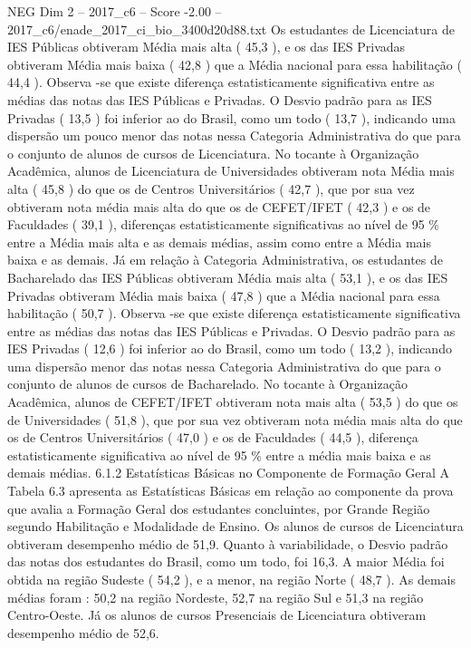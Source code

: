 \begin{textsample}{NEG Dim 2 – 2017\_c6 – Score -2.00 – 2017\_c6/enade\_2017\_ci\_bio\_3400d20d88.txt}
Os estudantes de Licenciatura de IES Públicas obtiveram Média mais alta ( 45,3 ), e os das IES Privadas obtiveram Média mais baixa ( 42,8 ) que a Média nacional para essa habilitação ( 44,4 ).
Observa -se que existe diferença estatisticamente significativa entre as médias das notas das IES Públicas e Privadas.
O Desvio padrão para as IES Privadas ( 13,5 ) foi inferior ao do Brasil, como um todo ( 13,7 ), indicando uma dispersão um pouco menor das notas nessa Categoria Administrativa do que para o conjunto de alunos de cursos de Licenciatura.
No tocante à Organização Acadêmica, alunos de Licenciatura de Universidades obtiveram nota Média mais alta ( 45,8 ) do que os de Centros Universitários ( 42,7 ), que por sua vez obtiveram nota média mais alta do que os de CEFET/IFET ( 42,3 ) e os de Faculdades ( 39,1 ), diferenças estatisticamente significativas ao nível de 95 \% entre a Média mais alta e as demais médias, assim como entre a Média mais baixa e as demais.
Já em relação à Categoria Administrativa, os estudantes de Bacharelado das IES Públicas obtiveram Média mais alta ( 53,1 ), e os das IES Privadas obtiveram Média mais baixa ( 47,8 ) que a Média nacional para essa habilitação ( 50,7 ).
Observa -se que existe diferença estatisticamente significativa entre as médias das notas das IES Públicas e Privadas.
O Desvio padrão para as IES Privadas ( 12,6 ) foi inferior ao do Brasil, como um todo ( 13,2 ), indicando uma dispersão menor das notas nessa Categoria Administrativa do que para o conjunto de alunos de cursos de Bacharelado.
No tocante à Organização Acadêmica, alunos de CEFET/IFET obtiveram nota mais alta ( 53,5 ) do que os de Universidades ( 51,8 ), que por sua vez obtiveram nota média mais alta do que os de Centros Universitários ( 47,0 ) e os de Faculdades ( 44,5 ), diferença estatisticamente significativa ao nível de 95 \% entre a média mais baixa e as demais médias. 6.1.2 Estatísticas Básicas no Componente de Formação Geral A Tabela 6.3 apresenta as Estatísticas Básicas em relação ao componente da prova que avalia a Formação Geral dos estudantes concluintes, por Grande Região segundo Habilitação e Modalidade de Ensino.
Os alunos de cursos de Licenciatura obtiveram desempenho médio de 51,9.
Quanto à variabilidade, o Desvio padrão das notas dos estudantes do Brasil, como um todo, foi 16,3.
A maior Média foi obtida na região Sudeste ( 54,2 ), e a menor, na região Norte ( 48,7 ).
As demais médias foram : 50,2 na região Nordeste, 52,7 na região Sul e 51,3 na região Centro-Oeste.
Já os alunos de cursos Presenciais de Licenciatura obtiveram desempenho médio de 52,6.

\end{textsample}
